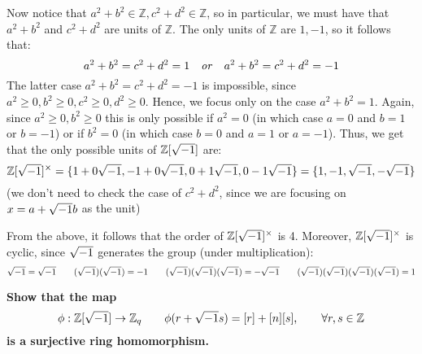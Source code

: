 \documentclass{exam}
\begin{document}
\begin{questions}
Now notice that $a^2 + b^2 \in \mathbb{Z}, c^2 + d^2 \in \mathbb{Z}$, so in particular, we must have that $a^2 + b^2$ and $c^2 + d^2$ are units of $\mathbb{Z}$. The only units of $\mathbb{Z}$ are $1,-1$, so it follows that:
\[
a^2 + b^2 = c^2 + d^2 = 1 \quad \text{\textit{or}} \quad a^2 + b^2 = c^2 + d^2 = -1
\]
The latter case $a^2 + b^2 = c^2 + d^2 = -1$ is impossible, since $a^2 \geq 0, b^2 \geq 0, c^2 \geq 0, d^2 \geq 0$. Hence, we focus only on the case $a^2 + b^2 = 1$. Again, since $a^2 \geq 0, b^2 \geq 0$ this is only possible if $a^2 = 0$ (in which case $a = 0$ and $b = 1$ or $b = -1$) or if $b^2 = 0$ (in which case $b = 0$ and $a = 1$ or $a = -1$). Thus, we get that the only possible units of $\mathbb{Z}[\sqrt{-1}]$ are:
\[
\mathbb{Z}[\sqrt{-1}]^\times = \{1 + 0\sqrt{-1}, -1 + 0\sqrt{-1}, 0 + 1\sqrt{-1}, 0 - 1\sqrt{-1}\} = \{1,-1,\sqrt{-1}, -\sqrt{-1}\}
\]
(we don't need to check the case of $c^2 + d^2$, since we are focusing on $x = a + \sqrt{-1} b$ as the unit)
\smallskip

From the above, it follows that the order of $\mathbb{Z}[\sqrt{-1}]^\times$ is 4. Moreover, $\mathbb{Z}[\sqrt{-1}]^\times$ is cyclic, since $\sqrt{-1}$ generates the group (under multiplication):
\[
\sqrt{-1} = \sqrt{-1} \qquad (\sqrt{-1})(\sqrt{-1}) = -1 \qquad (\sqrt{-1})(\sqrt{-1})(\sqrt{-1}) = -\sqrt{-1} \qquad (\sqrt{-1})(\sqrt{-1})(\sqrt{-1})(\sqrt{-1}) = 1
\]

\question \textbf{Show that the map}
\[
\phi : \mathbb{Z}[\sqrt{-1}] \to \mathbb{Z}_q \qquad \phi(r + \sqrt{-1} s) = [r] + [n][s], \qquad \forall r,s \in \mathbb{Z}
\]
\textbf{is a surjective ring homomorphism.}


\end{questions}
\end{document}
